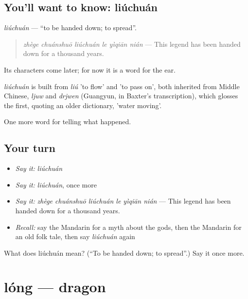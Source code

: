 \subsection*{You'll want to know: liúchuán}
\emph{liúchuán} — \textquotedblleft{}to be handed down; to spread\textquotedblright{}.

\begin{quote}
\emph{zhège chuánshuō liúchuán le yìqiān nián} — This legend has been handed down for a thousand years.
\end{quote}

Its characters come later; for now it is a word for the ear.

\begin{cousinweb}
\emph{liúchuán} is built from \emph{liú} 'to flow' and  'to pass on', both inherited from Middle Chinese, \emph{ljuw} and \emph{drjwen} (Guangyun, in Baxter's transcription), which glosses the first, quoting an older dictionary, 'water moving'.
\end{cousinweb}

\begin{grammarlens}[title={What you've built}]
One more word for telling what happened.
\end{grammarlens}

\subsection*{Your turn}
\begin{itemize}
\raggedright
  \item \emph{Say it:} \emph{liúchuán}
  \item \emph{Say it:} \emph{liúchuán}, once more
  \item \emph{Say it:} \emph{zhège chuánshuō liúchuán le yìqiān nián} — This legend has been handed down for a thousand years.
  \item \emph{Recall:} say the Mandarin for a myth about the gods, then the Mandarin for an old folk tale, then say \emph{liúchuán} again
\end{itemize}

\begin{tcolorbox}[breakable,colback=teal!4,colframe=teal!35!black,title={Before you move on}]
What does liúchuán mean? (\textquotedblleft{}To be handed down; to spread\textquotedblright{}.) Say it once more.
\end{tcolorbox}
\section[lóng]{lóng — dragon}

